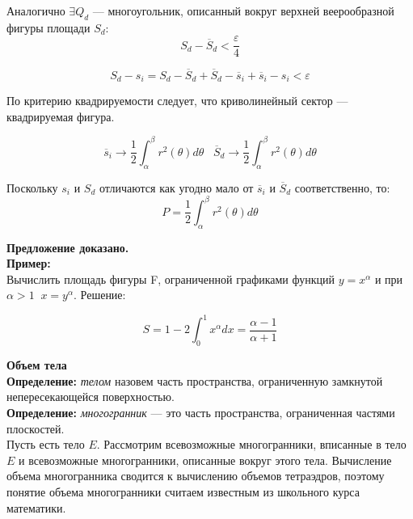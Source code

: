\documentclass{article}
\begin{document}
  Аналогично $\exists Q_d$ --- многоугольник, описанный вокруг верхней веерообразной фигуры площади $S_d:$
  \begin{equation}
    S_d-\overline S_d<\frac{\varepsilon}{4}
  \end{equation}
  
  \begin{equation}
    S_d-s_i=S_d-\overline S_d+\overline S_d-\overline s_i+\overline s_i-s_i<\varepsilon
  \end{equation}
  
  По критерию квадрируемости следует, что криволинейный сектор --- квадрируемая фигура.
  
  \begin{equation}
    \overline s_i\rightarrow \frac{1}{2}\int_\alpha^\beta r^2(\theta)d\theta\;\;\;\overline S_d\rightarrow \frac{1}{2}\int_\alpha^\beta r^2(\theta)d\theta
  \end{equation}
  
  Поскольку $s_i$ и $S_d$ отличаются как угодно мало от $\overline s_i$ и $\overline S_d$ соответственно, то:
  \begin{equation}
    P=\frac{1}{2}\int_\alpha^\beta r^2(\theta)d\theta
  \end{equation}
  
  \textbf{Предложение доказано.}\\
  
  \textbf{Пример:}\\
  
  Вычислить площадь фигуры F, ограниченной графиками функций $y=x^\alpha$ и при $\alpha>1\;\;x=y^\alpha$. Решение:
  
  \begin{equation}
    S=1-2\int_0^1 x^\alpha dx=\frac{\alpha-1}{\alpha+1}
  \end{equation}
  
  \huge\textbf{Объем тела}\normalsize\\
  
  \textbf{Определение:} \textit{телом} назовем часть пространства, ограниченную замкнутой непересекающейся поверхностью.\\
  
  \textbf{Определение:} \textit{многогранник} --- это часть пространства, ограниченная частями плоскостей.\\
  
  Пусть есть тело $E$. Рассмотрим всевозможные многогранники, вписанные в тело $E$ и всевозможные многогранники, описанные вокруг этого тела. Вычисление объема многогранника сводится к вычислению объемов тетраэдров, поэтому понятие объема многогранники считаем известным из школьного курса математики.\\
  
\end{document}
